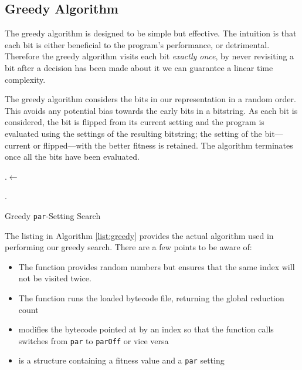 \subsection{Greedy Algorithm}

The greedy algorithm is designed to be simple but effective. The intuition is
that each bit is either beneficial to the program's performance, or
detrimental. Therefore the greedy algorithm visits each bit \emph{exactly
once}, by never revisiting a bit after a decision has been made about it we can
guarantee a linear time complexity.

The greedy algorithm considers the bits in our representation in a random
order.  This avoids any potential bias towards the early bits in a bitstring.
As each bit is considered, the bit is flipped from its current setting and the
program is evaluated using the settings of the resulting bitstring; the setting
of the bit---current or flipped---with the better fitness is retained.  The
algorithm terminates once all the bits have been evaluated.


\begin{algorithm}
\DontPrintSemicolon
{}

\BlankLine

\Best.\Fitness $\leftarrow$ \evaluateProg{}\;
\BlankLine

\BlankLine
\Return \Best.\Setting\;
\caption{Greedy \texttt{par}-Setting Search}
\label{list:greedy}
\end{algorithm}

The listing in Algorithm \ref{list:greedy} provides the actual algorithm used
in performing our greedy search. There are a few points to be aware of:

\begin{itemize}
  \item The function  provides random numbers but ensures
        that the same index will not be visited twice.
  \item The function  runs the loaded bytecode file,
        returning the global reduction count
  \item {} modifies the bytecode pointed at by an index so that
        the function calls switches from \verb|par| to \verb|parOff| or vice versa
  \item {} is a structure containing a fitness value and a \verb|par|
        setting
\end{itemize}

